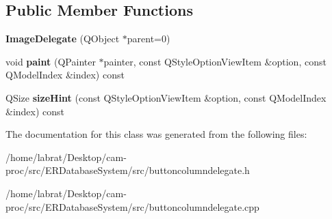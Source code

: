 \subsection*{Public Member Functions}
\begin{DoxyCompactItemize}
\item 
{\bfseries Image\+Delegate} (Q\+Object $\ast$parent=0)\hypertarget{classImageDelegate_a97d330e9981a0d48ca2df25ce2b9ccb0}{}\label{classImageDelegate_a97d330e9981a0d48ca2df25ce2b9ccb0}

\item 
void {\bfseries paint} (Q\+Painter $\ast$painter, const Q\+Style\+Option\+View\+Item \&option, const Q\+Model\+Index \&index) const \hypertarget{classImageDelegate_a014addfd142a1c0e7ef4c817f629b123}{}\label{classImageDelegate_a014addfd142a1c0e7ef4c817f629b123}

\item 
Q\+Size {\bfseries size\+Hint} (const Q\+Style\+Option\+View\+Item \&option, const Q\+Model\+Index \&index) const \hypertarget{classImageDelegate_a54c1fd69665d86970bc3949749dc2804}{}\label{classImageDelegate_a54c1fd69665d86970bc3949749dc2804}

\end{DoxyCompactItemize}


The documentation for this class was generated from the following files\+:\begin{DoxyCompactItemize}
\item 
/home/labrat/\+Desktop/cam-\/proc/src/\+E\+R\+Database\+System/src/buttoncolumndelegate.\+h\item 
/home/labrat/\+Desktop/cam-\/proc/src/\+E\+R\+Database\+System/src/buttoncolumndelegate.\+cpp\end{DoxyCompactItemize}
